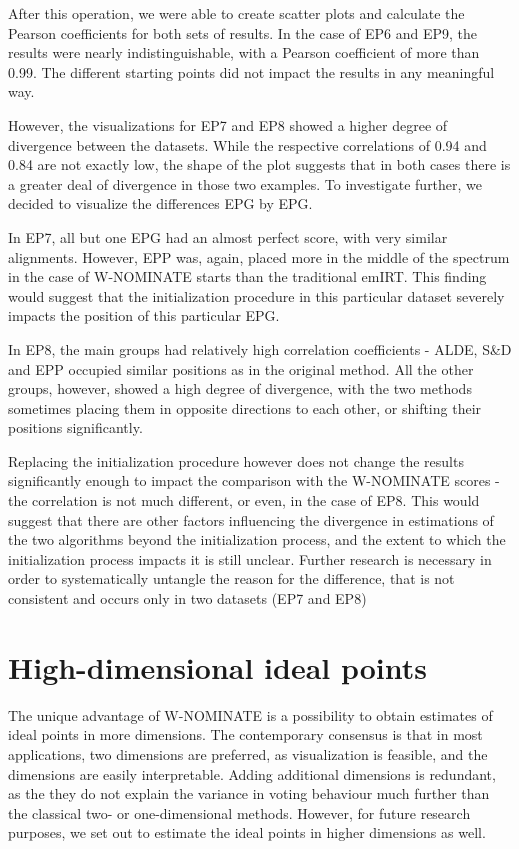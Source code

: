 \documentclass[a4paper,12pt]{report}
\begin{document}
    After this operation, we were able to create scatter plots and calculate the Pearson coefficients for both sets
    of results.
    In the case of EP6 and EP9, the results were nearly indistinguishable, with a Pearson coefficient of
    more than 0.99.
    The different starting points did not impact the results in any meaningful way.

    However, the visualizations for EP7 and EP8 showed a higher degree of divergence between the datasets. While the
    respective correlations of 0.94 and 0.84 are not exactly low, the shape of the plot suggests that in both cases
    there is a greater deal of divergence in those two examples. To investigate further, we decided to visualize the
    differences EPG by EPG.

    In EP7, all but one EPG had an almost perfect score, with very similar alignments. However, EPP was, again,
    placed more in the middle of the spectrum in the case of W-NOMINATE starts than the traditional emIRT. This
    finding would suggest that the initialization procedure in this particular dataset severely impacts the position of
    this particular EPG.

    In EP8, the main groups had relatively high correlation coefficients - ALDE, S\&D and EPP occupied similar
    positions as in the original method. All the other groups, however, showed a high degree of divergence, with the
    two methods sometimes placing them in opposite directions to each other, or shifting their positions significantly.

    Replacing the initialization procedure however does not change the results significantly enough to impact the
    comparison with the W-NOMINATE scores - the correlation is not much different, or even, in the case of EP8. This
    would suggest that there are other factors influencing the divergence in estimations of the two algorithms
    beyond the initialization process, and the extent to which the initialization process impacts it is still unclear.
    Further research is necessary in order to systematically untangle the reason for the difference, that is not
    consistent and occurs only in two datasets (EP7 and EP8)


    \section{High-dimensional ideal points}\label{sec:high-dimensional-ideal-points}
    The unique advantage of W-NOMINATE is a possibility to obtain estimates of ideal points in more dimensions. The
    contemporary consensus is that in
    most applications, two dimensions are preferred, as visualization is feasible, and the dimensions are easily
    interpretable.
    Adding additional dimensions is redundant, as the they do not explain the variance in voting
    behaviour much further
    than the classical two- or one-dimensional methods.
    However, for future research purposes, we set out to
    estimate the ideal points in higher dimensions as well.
\end{document}
